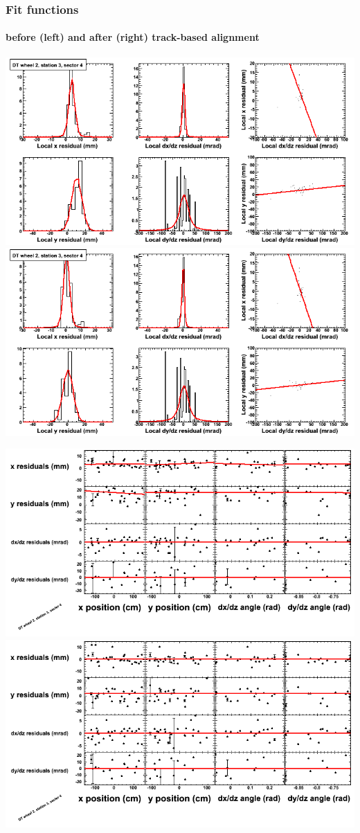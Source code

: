 \documentclass[compress]{beamer}
\begin{document}
\begin{frame}
\frametitle{Fit functions}
\framesubtitle{before (left) and after (right) track-based alignment}
\includegraphics[width=0.5\linewidth]{fitfunctions_re01/MBwhEst3sec04_bellcurves.png} \includegraphics[width=0.5\linewidth]{fitfunctions_re05/MBwhEst3sec04_bellcurves.png}

\includegraphics[width=0.5\linewidth]{fitfunctions_re01/MBwhEst3sec04_polynomials.png} \includegraphics[width=0.5\linewidth]{fitfunctions_re05/MBwhEst3sec04_polynomials.png}
\end{frame}
\end{document}
